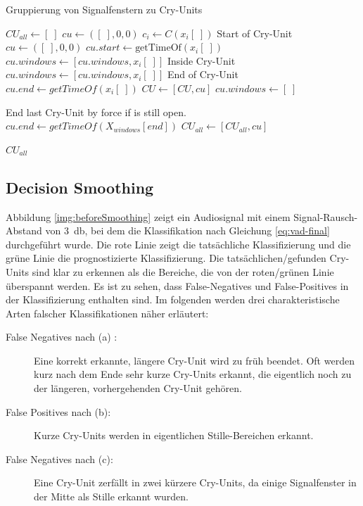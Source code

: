\begin{algorithm}[h]
	\caption{Gruppierung von Signalfenstern zu Cry-Units}
	\label{alg:cryUnit}
	\begin{algorithmic}[1]
		\State $ CU_{all} \gets [\;]$
		\State $ cu\gets ([\;],0,0)$
				\State $ c_i \gets C(x_i[\;])$
				\State \Comment Start of Cry-Unit
						\State $ cu\gets ([\;],0,0)$
						\State $cu.start \gets \text{getTimeOf}(x_i[\;])$
						\State $cu.windows \gets [cu.windows, x_i[\;]]$
				\EndIf
				\State \Comment Inside Cry-Unit
						\State $cu.windows \gets [cu.windows, x_i[\;]]$
				\EndIf
				\State \Comment End of Cry-Unit
						\State $cu.end \gets  getTimeOf(x_i[\;])$
						\State $CU \gets [CU, cu]$
						\State $cu.windows \gets [\;]$
				\EndIf
		\EndFor
		
		\State \Comment End last Cry-Unit by force if is still open.
		\State $cu.end \gets  getTimeOf(X_{windows}[end])$
		\State $CU_{all} \gets [CU_{all}, cu]$
		\EndIf
		
		\Return $CU_{all}$
		
		\EndFunction
		
	\end{algorithmic}
\end{algorithm}

\subsection{Decision Smoothing}

Abbildung \ref{img:beforeSmoothing} zeigt ein Audiosignal mit einem Signal-Rausch-Abstand von \SI{3}{\decibel}, bei dem die Klassifikation nach Gleichung \ref{eq:vad-final} durchgeführt wurde. Die rote Linie zeigt die tatsächliche Klassifizierung und die grüne Linie die prognostizierte Klassifizierung. Die tatsächlichen/gefunden Cry-Units sind klar zu erkennen als die Bereiche, die von der roten/grünen Linie überspannt werden. Es ist zu sehen, dass False-Negatives und False-Positives in der Klassifizierung enthalten sind. Im folgenden werden drei charakteristische Arten falscher Klassifikationen näher erläutert:

\begin{description}
	\item [False Negatives nach (a) :] Eine korrekt erkannte, längere Cry-Unit wird zu früh beendet. Oft werden kurz nach dem Ende sehr kurze Cry-Units erkannt, die eigentlich noch zu der längeren, vorhergehenden Cry-Unit gehören.
	\item [False Positives nach (b): ] Kurze Cry-Units werden in eigentlichen Stille-Bereichen erkannt.
	\item [False Negatives nach (c): ] Eine Cry-Unit zerfällt in zwei kürzere Cry-Units, da einige Signalfenster in der Mitte als Stille erkannt wurden.
\end{description}

